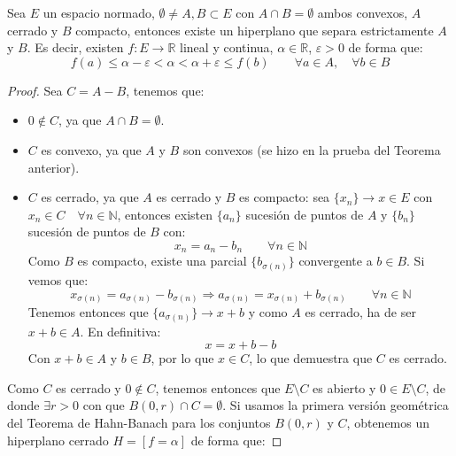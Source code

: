 \begin{teo}\label{teo:hahn-banach_2aversiongeometrica}
    Sea $E$ un espacio normado, $\emptyset \neq A, B\subset E$ con $A\cap B=\emptyset $ ambos convexos, $A$ cerrado y $B$ compacto, entonces existe un hiperplano que separa estrictamente $A$ y $B$. Es decir, existen $f:E\to \mathbb{R}$ lineal y continua, $\alpha\in \mathbb{R}$, $\varepsilon>0$ de forma que:
    \begin{equation*}
        f(a) \leq \alpha - \varepsilon < \alpha < \alpha + \varepsilon \leq f(b) \qquad \forall a\in A, \quad \forall b\in B
    \end{equation*}
    \begin{proof}
        Sea $C=A-B$, tenemos que:
        \begin{itemize}
            \item $0\notin C$, ya que $A\cap B = \emptyset $.
            \item $C$ es convexo, ya que $A$ y $B$ son convexos (se hizo en la prueba del Teorema anterior).
            \item $C$ es cerrado, ya que $A$ es cerrado y $B$ es compacto: sea $\{x_n\}\to x\in E$ con $x_n \in C \quad \forall n\in \mathbb{N}$, entonces existen $\{a_n\}$ sucesión de puntos de $A$ y $\{b_n\}$ sucesión de puntos de $B$ con:
                \begin{equation*}
                    x_n = a_n - b_n \qquad \forall n\in \mathbb{N}
                \end{equation*}
                Como $B$ es compacto, existe una parcial $\{b_{\sigma(n)}\}$ convergente a $b\in B$. Si vemos que:
                \begin{equation*}
                    x_{\sigma(n)} = a_{\sigma(n)} - b_{\sigma(n)} \Longrightarrow a_{\sigma(n)} = x_{\sigma(n)} + b_{\sigma(n)} \qquad \forall n\in \mathbb{N}
                \end{equation*}
                Tenemos entonces que $\{a_{\sigma(n)}\} \to x + b$ y como $A$ es cerrado, ha de ser $x+b\in A$. En definitiva:
                \begin{equation*}
                    x = x + b - b
                \end{equation*}
                Con $x+b\in A$ y $b\in B$, por lo que $x\in C$, lo que demuestra que $C$ es cerrado.
        \end{itemize}
        Como $C$ es cerrado y $0\notin C$, tenemos entonces que $E\setminus C$ es abierto y $0\in E\setminus C$, de donde $\exists r>0$ con que $B(0,r)\cap C = \emptyset $. Si usamos la primera versión geométrica del Teorema de Hahn-Banach para los conjuntos $B(0,r)$ y $C$, obtenemos un hiperplano cerrado $H=[f=\alpha]$ de forma que:

\end{proof}
\end{teo}
